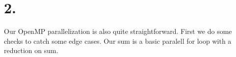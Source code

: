 \documentclass{article}
\begin{document}
\section{2.}
Our OpenMP parallelization is also quite straightforward. First we do some checks to catch some edge cases. Our sum is a basic paralell for loop with a reduction on sum.
\end{document}
